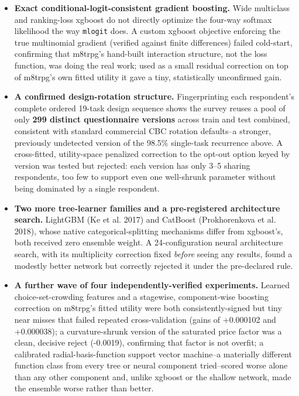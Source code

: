 \documentclass[
  9.5pt,
]{article}
\begin{document}
\begin{itemize}
  (2000)) was decisively harmful (bootstrap interval excluding zero on
  the harmful side): down-weighting training respondents costs more
  effective sample size than it gains from targeting the shifted
  population.
\item
  \textbf{Exact conditional-logit-consistent gradient boosting.} Wide
  multiclass and ranking-loss xgboost do not directly optimize the
  four-way softmax likelihood the way \texttt{mlogit} does. A custom
  xgboost objective enforcing the true multinomial gradient (verified
  against finite differences) failed cold-start, confirming that
  m8trpg's hand-built interaction structure, not the loss function, was
  doing the real work; used as a small residual correction on top of
  m8trpg's own fitted utility it gave a tiny, statistically unconfirmed
  gain.
\item
  \textbf{A confirmed design-rotation structure.} Fingerprinting each
  respondent's complete ordered 19-task design sequence shows the survey
  reuses a pool of only \textbf{299 distinct questionnaire versions}
  across train and test combined, consistent with standard commercial
  CBC rotation defaults--a stronger, previously undetected version of
  the 98.5\% single-task recurrence above. A cross-fitted, utility-space
  penalized correction to the opt-out option keyed by version was tested
  but rejected: each version has only 3--5 sharing respondents, too few
  to support even one well-shrunk parameter without being dominated by a
  single respondent.
\item
  \textbf{Two more tree-learner families and a pre-registered
  architecture search.} LightGBM (Ke et al. 2017) and CatBoost
  (Prokhorenkova et al. 2018), whose native categorical-splitting
  mechanisms differ from xgboost's, both received zero ensemble weight.
  A 24-configuration neural architecture search, with its multiplicity
  correction fixed \emph{before} seeing any results, found a modestly
  better network but correctly rejected it under the pre-declared rule.
\item
  \textbf{A further wave of four independently-verified experiments.}
  Learned choice-set-crowding features and a stagewise, component-wise
  boosting correction on m8trpg's fitted utility were both
  consistently-signed but tiny near misses that failed repeated
  cross-validation (gains of +0.000102 and +0.000038); a
  curvature-shrunk version of the saturated price factor was a clean,
  decisive reject (-0.0019), confirming that factor is not overfit; a
  calibrated radial-basis-function support vector machine--a materially
  different function class from every tree or neural component
  tried--scored worse alone than any other component and, unlike xgboost
  or the shallow network, made the ensemble worse rather than better.
\end{itemize}
\end{document}
